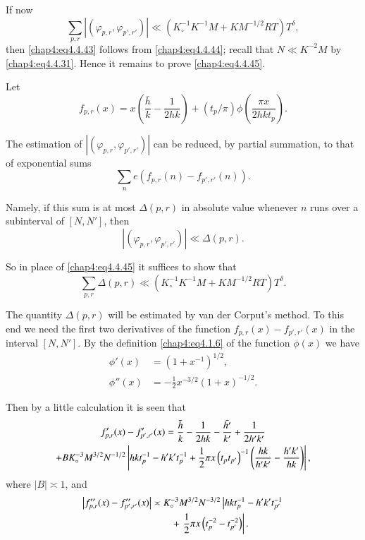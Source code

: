 If now
\begin{equation}\label{chap4:eq4.4.45}
\sum\limits_{p,r}\left|\left(\varphi_{p,r},\varphi_{p',r'}\right)\right| \ll \left( K_\circ^{-1}K^{-1}M+KM^{-1/2}RT\right)T^\delta,
\end{equation}
then \eqref{chap4:eq4.4.43} follows from \eqref{chap4:eq4.4.44};
recall that $N\ll K^{-2}M$ by \eqref{chap4:eq4.4.31}. Hence it remains
to prove \eqref{chap4:eq4.4.45}. 

Let 
$$
f_{p,r}(x)=x\left(\frac{\bar{h}}{k}-\frac{1}{2hk}\right)+\left(t_p/\pi\right)\phi\left(\frac{\pi x}{2hkt_p}\right).
$$

The estimation of $|(\varphi_{p,r},\varphi_{p',r'})|$ can be reduced, by partial summation, to that of exponential sums
$$
\sum\limits_n e\left(f_{p,r}(n)-f_{p',r'}(n)\right).
$$

Namely, if this sum is at most $\Delta(p,r)$ in absolute value whenever $n$ runs over a subinterval of $[N,N']$, then 
$$
\left|\left(\varphi_{p,r},\varphi_{p',r'}\right)\right|\ll \Delta(p,r).
$$

So in place  of \eqref{chap4:eq4.4.45} it suffices to show that
\begin{equation}\label{chap4:eq4.4.46}
\sum\limits_{p,r}\Delta(p,r)\ll \left(K_\circ^{-1}K^{-1}M+KM^{-1/2}RT\right)T^\delta.
\end{equation}

The quantity $\Delta(p,r)$ will be estimated by van der Corput's method. To this end we need the first two derivatives of the function $f_{p,r}(x)-f_{p',r'}(x)$ in the interval $[N,N']$. By the definition \eqref{chap4:eq4.1.6} of the function $\phi(x)$ we have 
\begin{align*}
\phi'(x) &= \left(1+x^{-1}\right)^{1/2},\\
\phi''(x) &= -\frac{1}{2}x^{-3/2}(1+x)^{-1/2}.
\end{align*}\pageoriginale

Then by a little calculation it is seen that 
\begin{gather}
f'_{p,r}(x)-f'_{p',r'}(x)=\frac{\bar{h}}{k}-\frac{1}{2hk}-\frac{\bar{h'}}{k'}+ \frac{1}{2h'k'}\label{chap4:eq4.4.47}\\
+BK_\circ^{-3}M^{3/2}N^{-1/2}\left|hkt_p^{-1}-h'k't_p^{-1}+\frac{1}{2}\pi x\left(t_p t_{p'}\right)^{-1}\left(\frac{hk}{h'k'}-\frac{h'k'}{hk}\right) \right|,\notag
\end{gather}
where $|B|\asymp 1$, and 
\begin{align}
\left|f''_{p,r}(x)-f''_{p',r'}(x)\right| & \asymp K_\circ^{-3}M^{3/2}N^{-3/2}\left| hkt_p^{-1}-h'k't_{p'}^{-1}\right.\label{chap4:eq4.4.48}\\
&\qquad +\left.\frac{1}{2}\pi x \left(t_p^{-2}-t_{p'}^{-2}\right)\right|.\notag
\end{align}


